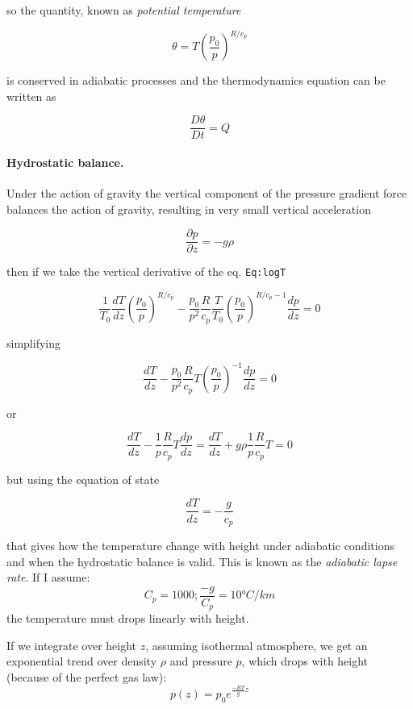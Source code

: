 so the quantity, known as \emph{potential temperature}

\[\theta = T\left(\frac{p_0}{p}\right)^{R/c_p}\]

is conserved in adiabatic processes and the thermodynamics equation can be written as

\[\frac{D \theta}{Dt} = Q\]

\paragraph{Hydrostatic balance.}
Under the action of gravity the vertical component of the pressure
gradient force balances the action of gravity, resulting in very small
vertical acceleration

\[\frac{\partial p}{\partial z} =  -g \rho\]

then if we take the vertical derivative of the eq. \texttt{Eq:logT}

\[\frac{1}{T_0}\frac{d T}{dz}\left(\frac{p_0}{p}\right)^{R/c_p} -\frac{p_0}{p^2}\frac{R}{c_p}\frac{T}{T_0}\left(\frac{p_0}{p}\right)^{R/c_p-1}\frac{d p}{dz} = 0\]

simplifying

\[\frac{d T}{dz} -\frac{p_0}{p^2}\frac{R}{c_p}T\left(\frac{p_0}{p}\right)^{-1}\frac{d p}{dz} = 0\]

or

\[\frac{d T}{dz} -\frac{1}{p}\frac{R}{c_p}T\frac{d p}{dz} = \frac{d T}{dz} +g\rho\frac{1}{p}\frac{R}{c_p}T = 0\]

but using the equation of state

\[\frac{d T}{dz} = -\frac{g}{c_p}\]

that gives how the temperature change with height under adiabatic
conditions and when the hydrostatic balance is valid. This is known as
the \emph{adiabatic lapse rate}. If I assume:
$$C_p= 1000;   \frac{-g}{C_p} =10°C/km$$
the temperature must drops linearly with height.

If we integrate over height $z$, assuming isothermal atmosphere, we get an exponential trend over density $\rho$ and pressure $p$, which drops with height (because of the perfect gas law):
$$p(z)=p_0 e^{\frac{-RT}{g}z}$$
